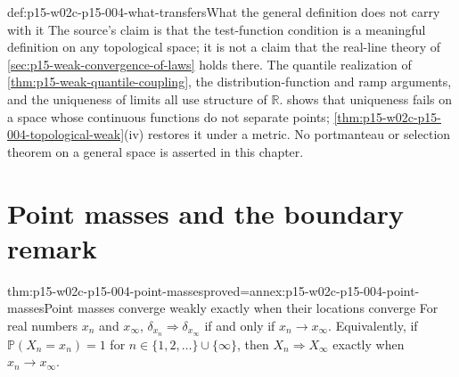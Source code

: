 \begin{hbwarning}{def:p15-w02c-p15-004-what-transfers}{What the general definition does not carry with it}
The source's claim is that the test-function condition is a meaningful
definition on any topological space; it is not a claim that the real-line
theory of \cref{sec:p15-weak-convergence-of-laws} holds there. The
quantile realization of \cref{thm:p15-weak-quantile-coupling}, the
distribution-function and ramp arguments, and the uniqueness of limits
all use structure of \(\mathbb R\). 
shows that uniqueness fails on a space whose continuous functions do not
separate points; \cref{thm:p15-w02c-p15-004-topological-weak}(iv)
restores it under a metric. No portmanteau or selection theorem on a
general space is asserted in this chapter.
\end{hbwarning}

\section{Point masses and the boundary remark}
\label{sec:p15-w02c-p15-004-boundary}

\begin{hbtheorem}{thm:p15-w02c-p15-004-point-masses}{proved=annex:p15-w02c-p15-004-point-masses}{Point masses converge weakly exactly when their locations converge}
For real numbers \(x_n\) and \(x_\infty\),
\(\delta_{x_n}\Rightarrow\delta_{x_\infty}\) if and only if
\(x_n\to x_\infty\). Equivalently, if
\(\mathbb P(X_n=x_n)=1\) for \(n\in\{1,2,\ldots\}\cup\{\infty\}\), then
\(X_n\Rightarrow X_\infty\) exactly when \(x_n\to x_\infty\).
\end{hbtheorem}

